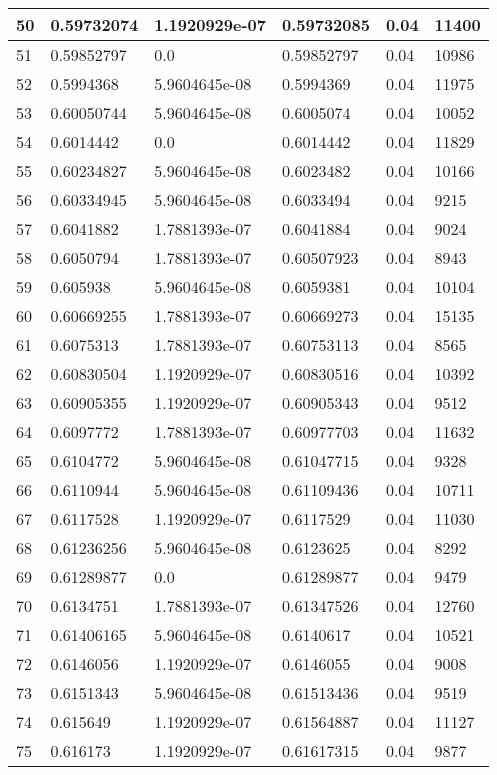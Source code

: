 \begin{longtable}{|l|l|l|l|l|l|}
50 & 0.59732074 & 1.1920929e-07 & 0.59732085 & 0.04 & 11400 \\ \hline 
51 & 0.59852797 & 0.0 & 0.59852797 & 0.04 & 10986 \\ \hline 
52 & 0.5994368 & 5.9604645e-08 & 0.5994369 & 0.04 & 11975 \\ \hline 
53 & 0.60050744 & 5.9604645e-08 & 0.6005074 & 0.04 & 10052 \\ \hline 
54 & 0.6014442 & 0.0 & 0.6014442 & 0.04 & 11829 \\ \hline 
55 & 0.60234827 & 5.9604645e-08 & 0.6023482 & 0.04 & 10166 \\ \hline 
56 & 0.60334945 & 5.9604645e-08 & 0.6033494 & 0.04 & 9215 \\ \hline 
57 & 0.6041882 & 1.7881393e-07 & 0.6041884 & 0.04 & 9024 \\ \hline 
58 & 0.6050794 & 1.7881393e-07 & 0.60507923 & 0.04 & 8943 \\ \hline 
59 & 0.605938 & 5.9604645e-08 & 0.6059381 & 0.04 & 10104 \\ \hline 
60 & 0.60669255 & 1.7881393e-07 & 0.60669273 & 0.04 & 15135 \\ \hline 
61 & 0.6075313 & 1.7881393e-07 & 0.60753113 & 0.04 & 8565 \\ \hline 
62 & 0.60830504 & 1.1920929e-07 & 0.60830516 & 0.04 & 10392 \\ \hline 
63 & 0.60905355 & 1.1920929e-07 & 0.60905343 & 0.04 & 9512 \\ \hline 
64 & 0.6097772 & 1.7881393e-07 & 0.60977703 & 0.04 & 11632 \\ \hline 
65 & 0.6104772 & 5.9604645e-08 & 0.61047715 & 0.04 & 9328 \\ \hline 
66 & 0.6110944 & 5.9604645e-08 & 0.61109436 & 0.04 & 10711 \\ \hline 
67 & 0.6117528 & 1.1920929e-07 & 0.6117529 & 0.04 & 11030 \\ \hline 
68 & 0.61236256 & 5.9604645e-08 & 0.6123625 & 0.04 & 8292 \\ \hline 
69 & 0.61289877 & 0.0 & 0.61289877 & 0.04 & 9479 \\ \hline 
70 & 0.6134751 & 1.7881393e-07 & 0.61347526 & 0.04 & 12760 \\ \hline 
71 & 0.61406165 & 5.9604645e-08 & 0.6140617 & 0.04 & 10521 \\ \hline 
72 & 0.6146056 & 1.1920929e-07 & 0.6146055 & 0.04 & 9008 \\ \hline 
73 & 0.6151343 & 5.9604645e-08 & 0.61513436 & 0.04 & 9519 \\ \hline 
74 & 0.615649 & 1.1920929e-07 & 0.61564887 & 0.04 & 11127 \\ \hline 
75 & 0.616173 & 1.1920929e-07 & 0.61617315 & 0.04 & 9877 \\ \hline 
\end{longtable}